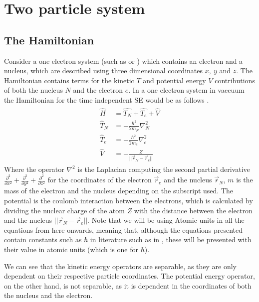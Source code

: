 \documentclass[../master_thesis.tex]{subfiles}
\begin{document}
\section{Two particle system}
\subsection{The Hamiltonian}
Consider a one electron system (such as  or ) which contains an
electron and a nucleus, which are described using three dimensional coordinates
$ x,\ y $ and $ z $. The Hamiltonian contains terms for the kinetic $T$ and
potential energy $V$ contributions of both the nucleus $ N $ and the electron
$ e $. In a one electron system in vaccuum the Hamiltonian for the time independent
\ac{SE} would be as follows \cite{Jensen:2017, Cramer:2004}.
\begin{align}
  \begin{split}
    \hat{H}   &= \hat{T_N} + \hat{T_e} + \hat{V} \\
    \hat{T}_N &= -\frac{\hbar^2}{2m_N}\nabla^2_N \\
    \hat{T}_e &= -\frac{\hbar^2}{2m_e}\nabla^2_e \\
    \hat{V}   &= -\frac{Z}{||\vec{r}_N - \vec{r}_e||} \label{eq:twopH}
  \end{split}
\end{align}
Where the operator $ \nabla^2$ is the Laplacian computing the second partial
derivative $ \frac{\partial^2}{\partial x^2} + \frac{\partial^2}{\partial y^2} +
\frac{\partial^2}{\partial z^2} $ for the coordinates of the electron $\vec{r}_e$
and the nucleus $\vec{r}_N$, $ m $ is the mass of the electron and the nucleus
depending on the subscript used. The potential is the coulomb interaction
between the electrons, which is calculated by dividing the nuclear charge of the
atom $ Z $ with the distance between the electron and the nucleus
$ ||\vec{r}_N - \vec{r}_e|| $. Note that we will be using Atomic units in all
the equations from here onwards, meaning that, although the equations presented
contain constants such as $\hbar$ in literature such as in \cite{Atkins:2014},
these will be presented with their value in atomic units (which is one for
$\hbar$).

We can see that the kinetic energy operators are separable, as they are only
dependent on their respective particle coordinates. The potential energy
operator, on the other hand, is not separable, as it is dependent in the
coordinates of both the nucleus and the electron.
\end{document}
